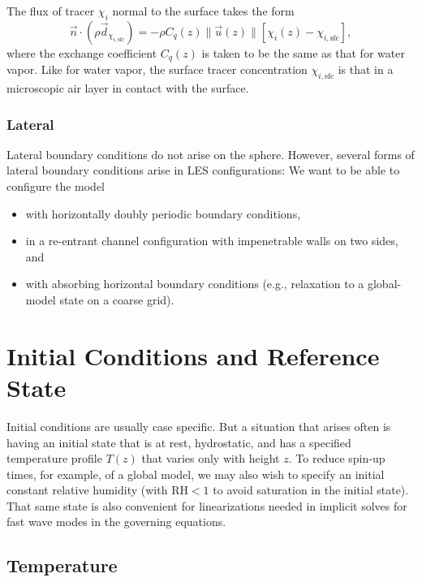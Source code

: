 \documentclass{report}
\begin{document}
The flux of tracer $\chi_i$ normal to the surface takes the form 
\begin{equation}\label{e:sfc_tracer}
 \vec{n} \cdot (\rho \vec{d}_{\chi_{i, \mathrm{sfc}}}) = - \rho C_q(z) \| \vec{u}(z) \| \left[\chi_i(z) - \chi_{i, \mathrm{sfc}} \right],
\end{equation} 
where the exchange coefficient $C_q(z)$ is taken to be the same as that for water vapor. Like for water vapor, the surface tracer concentration $\chi_{i, \mathrm{sfc}}$ is that in a microscopic air layer in contact with the surface.

\subsection{Lateral}

Lateral boundary conditions do not arise on the sphere. However, several forms of lateral boundary conditions arise in LES configurations: We want to be able to configure the model
\begin{itemize}
    \item with horizontally doubly periodic boundary conditions,
    \item in a re-entrant channel configuration with impenetrable walls on two sides, and 
    \item with absorbing horizontal boundary conditions (e.g., relaxation to a global-model state on a coarse grid). 
\end{itemize}

\chapter{Initial Conditions and Reference State}\label{s:initial_conditions}

Initial conditions are usually case specific. But a situation that arises often is having an initial state that is at rest, hydrostatic, and has a specified temperature profile $T(z)$ that varies only with height $z$. To reduce spin-up times, for example, of a global model, we may also wish to specify an initial constant relative humidity (with $\mathrm{RH} < 1$ to avoid saturation in the initial state). That same state is also convenient for linearizations needed in implicit solves for fast wave modes in the governing equations.

\section{Temperature}
\end{document}
